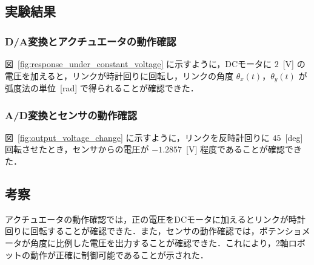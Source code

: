 \subsection{実験結果}
\subsubsection{D/A変換とアクチュエータの動作確認}
図~\ref{fig:response_under_constant_voltage} に示すように，DCモータに $2$~[V] の電圧を加えると，リンクが時計回りに回転し，リンクの角度 $\theta_{x}(t)$，$\theta_{y}(t)$ が弧度法の単位~[rad] で得られることが確認できた．

\subsubsection{A/D変換とセンサの動作確認}
図~\ref{fig:output_voltage_change} に示すように，リンクを反時計回りに $45$~[deg] 回転させたとき，センサからの電圧が $-1.2857$~[V] 程度であることが確認できた．

\subsection{考察}
アクチュエータの動作確認では，正の電圧をDCモータに加えるとリンクが時計回りに回転することが確認できた．また，センサの動作確認では，ポテンショメータが角度に比例した電圧を出力することが確認できた．これにより，2軸ロボットの動作が正確に制御可能であることが示された．
